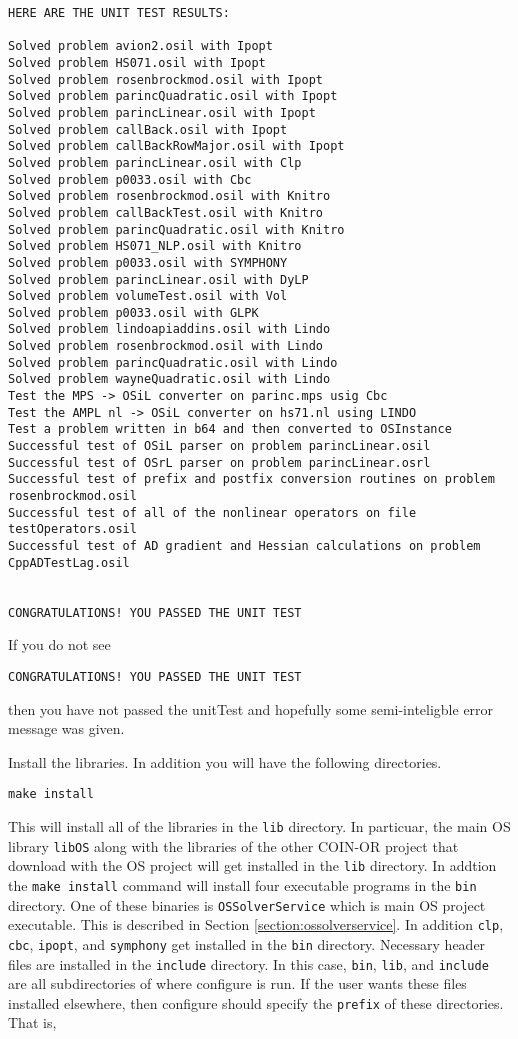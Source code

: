 \documentclass[11pt]{article}
\renewcommand{\_}{{\char"5F}}
\renewcommand{\{}{{\char"7B}}
\renewcommand{\}}{{\char"7D}}
\renewcommand{\^}{{\char"0D}}
\renewcommand{\'}{{\char"0D}}
\begin{document}
{\small
\begin{verbatim}
HERE ARE THE UNIT TEST RESULTS:

Solved problem avion2.osil with Ipopt
Solved problem HS071.osil with Ipopt
Solved problem rosenbrockmod.osil with Ipopt
Solved problem parincQuadratic.osil with Ipopt
Solved problem parincLinear.osil with Ipopt
Solved problem callBack.osil with Ipopt
Solved problem callBackRowMajor.osil with Ipopt
Solved problem parincLinear.osil with Clp
Solved problem p0033.osil with Cbc
Solved problem rosenbrockmod.osil with Knitro
Solved problem callBackTest.osil with Knitro
Solved problem parincQuadratic.osil with Knitro
Solved problem HS071_NLP.osil with Knitro
Solved problem p0033.osil with SYMPHONY
Solved problem parincLinear.osil with DyLP
Solved problem volumeTest.osil with Vol
Solved problem p0033.osil with GLPK
Solved problem lindoapiaddins.osil with Lindo
Solved problem rosenbrockmod.osil with Lindo
Solved problem parincQuadratic.osil with Lindo
Solved problem wayneQuadratic.osil with Lindo
Test the MPS -> OSiL converter on parinc.mps usig Cbc
Test the AMPL nl -> OSiL converter on hs71.nl using LINDO
Test a problem written in b64 and then converted to OSInstance
Successful test of OSiL parser on problem parincLinear.osil
Successful test of OSrL parser on problem parincLinear.osrl
Successful test of prefix and postfix conversion routines on problem rosenbrockmod.osil
Successful test of all of the nonlinear operators on file testOperators.osil
Successful test of AD gradient and Hessian calculations on problem CppADTestLag.osil


CONGRATULATIONS! YOU PASSED THE UNIT TEST
\end{verbatim}
}

If you do not see
\begin{verbatim}
CONGRATULATIONS! YOU PASSED THE UNIT TEST
\end{verbatim}
then you have not passed the unitTest and hopefully some semi-inteligble error message was given. 

\vskip 8pt

  Install the libraries.  In addition you will have the following directories.

\begin{verbatim}
make install
\end{verbatim}

This will install all of the libraries in the {\tt lib} directory.  In particuar, the main OS library {\tt libOS} along with the libraries of the other COIN-OR project that download with the OS project will get installed in the {\tt lib} directory.  In addtion the {\tt make install} command will install four executable programs in the {\tt bin} directory.  One of these binaries is {\tt OSSolverService} which is main OS project executable. This is described in Section \ref{section:ossolverservice}. In addition {\tt clp}, {\tt cbc}, {\tt ipopt}, and {\tt symphony} get installed  in the {\tt bin} directory.  Necessary header files are installed in the {\tt include} directory.   In this case, {\tt bin}, {\tt lib}, and {\tt include} are all subdirectories of where configure is run.   If the user wants these files installed elsewhere, then configure should specify the {\tt prefix} of these directories.  That is,
\end{document}
